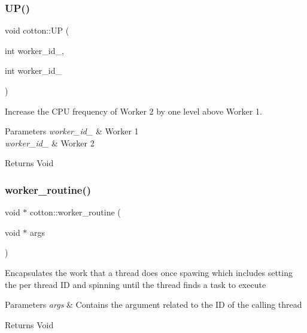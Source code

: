 \subsubsection{\texorpdfstring{U\+P()}{UP()}\hspace{0.1cm}{\footnotesize\ttfamily [2/2]}}
{\footnotesize\ttfamily void cotton\+::\+UP (\begin{DoxyParamCaption}\item[{int}]{worker\+\_\+id\+\_,  }\item[{int}]{worker\+\_\+id\+\_ }\end{DoxyParamCaption})}

Increase the C\+PU frequency of Worker 2 by one level above Worker 1.


\begin{DoxyParams}{Parameters}
{\em worker\+\_\+id\+\_} & Worker 1 \\
\hline
{\em worker\+\_\+id\+\_} & Worker 2\\
\hline
\end{DoxyParams}
\begin{DoxyReturn}{Returns}
Void 
\end{DoxyReturn}
\mbox{\label{cotton-runtime_8h_file_a361c34063ecb68cf02d417074decb12b}} 
\subsubsection{\texorpdfstring{worker\+\_\+routine()}{worker\_routine()}}
{\footnotesize\ttfamily void $\ast$ cotton\+::worker\+\_\+routine (\begin{DoxyParamCaption}\item[{void $\ast$}]{args }\end{DoxyParamCaption})}

Encapsulates the work that a thread does once spawing which includes setting the per thread ID and spinning until the thread finds a task to execute


\begin{DoxyParams}{Parameters}
{\em args} & Contains the argument related to the ID of the calling thread \\
\hline
\end{DoxyParams}
\begin{DoxyReturn}{Returns}
Void 
\end{DoxyReturn}
